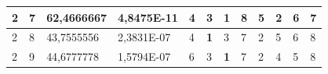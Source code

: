 \documentclass[conference]{IEEEtran}
\begin{document}
\begin{table}[]
\begin{tabular}{|llll|llllllll|}
\multicolumn{1}{|l|}{2}                                                     & \multicolumn{1}{l|}{7}                                                        & \multicolumn{1}{l|}{62,4666667}                                                   & 4,8475E-11                     & \multicolumn{1}{l|}{4}                                                  & \multicolumn{1}{l|}{3}                                                  & \multicolumn{1}{l|}{\textbf{1}}                                         & \multicolumn{1}{l|}{8}                                                  & \multicolumn{1}{l|}{5}                                                  & \multicolumn{1}{l|}{2}                                                  & \multicolumn{1}{l|}{6}                                                  & 7                          \\ \hline
\multicolumn{1}{|l|}{2}                                                     & \multicolumn{1}{l|}{8}                                                        & \multicolumn{1}{l|}{43,7555556}                                                   & 2,3831E-07                     & \multicolumn{1}{l|}{4}                                                  & \multicolumn{1}{l|}{\textbf{1}}                                         & \multicolumn{1}{l|}{3}                                                  & \multicolumn{1}{l|}{7}                                                  & \multicolumn{1}{l|}{2}                                                  & \multicolumn{1}{l|}{5}                                                  & \multicolumn{1}{l|}{6}                                                  & 8                          \\ \hline
\multicolumn{1}{|l|}{2}                                                     & \multicolumn{1}{l|}{9}                                                        & \multicolumn{1}{l|}{44,6777778}                                                   & 1,5794E-07                     & \multicolumn{1}{l|}{6}                                                  & \multicolumn{1}{l|}{3}                                                  & \multicolumn{1}{l|}{\textbf{1}}                                         & \multicolumn{1}{l|}{7}                                                  & \multicolumn{1}{l|}{2}                                                  & \multicolumn{1}{l|}{4}                                                  & \multicolumn{1}{l|}{5}                                                  & 8                          \\ \hline

\end{tabular}
\end{table}
\end{document}
